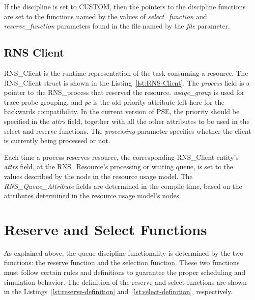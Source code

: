If the discipline is set to CUSTOM, then the pointers to the discipline functions are set to the functions named by the values of \emph{select\_function} and \emph{reserve\_function} parameters found in the file named by the \emph{file} parameter.

\subsection{RNS Client}
RNS\_Client is the runtime representation of the task consuming a resource. The RNS\_Client struct is shown in the Listing~\ref{lst:RNS-Client}. The \emph{process} field is a pointer to the RNS\_process that reserved the resource. \emph{usage\_group} is used for trace probe grouping, and \emph{pc} is the old priority attribute left here for the backwards compatibility. In the current version of PSE, the priority should be specified in the \emph{attrs} field, together with all the other attributes to be used in the select and reserve functions. The \emph{processing} parameter specifies whether the client is currently being processed or not.



Each time a process reserves resource, the corresponding RNS\_Client entity's \emph{attrs} field, at the RNS\_Resource's processing or waiting queue, is set to the values described by the node in the resource usage model. The \emph{RNS\_Queue\_Attribute} fields are determined in the compile time, based on the attributes determined in the resource usage model's nodes.

\section{Reserve and Select Functions}

As explained above, the queue discipline functionality is determined by the two functions: the reserve function and the selection function. These two functions must follow certain rules and definitions to guarantee the proper scheduling and simulation behavior. The definition of the reserve and select functions are shown in the Listings~\ref{lst:reserve-definition} and~\ref{lst:select-definition}, respectively.



